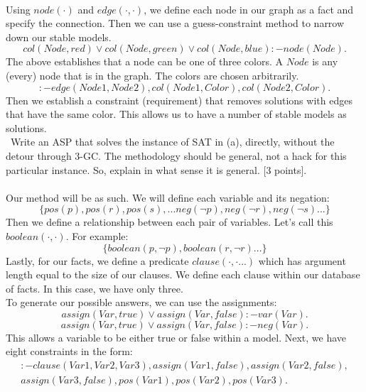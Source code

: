 \documentclass[12pt,fullpage]{article}
\begin{document}
\vspace{2mm} \\
Using $node(\cdot)$ and $edge(\cdot, \cdot)$, we define each node in our graph as a fact and specify the connection. Then we can use a guess-constraint method to narrow down our stable models.
$$col(Node, red) \vee col(Node, green) \vee col(Node, blue) :- node(Node).$$
The above establishes that a node can be one of three colors. A $Node$ is any (every) node that is in the graph. The colors are chosen arbitrarily.
$$:- edge(Node1, Node2),col(Node1, Color), col(Node2, Color).$$
Then we establish a constraint (requirement) that removes solutions with edges that have the same color. This allows us to have a number of stable models as solutions.\\


 \ Write an ASP that solves the instance of SAT in (a), directly,  without the detour through 3-GC. The methodology should be general, not a hack for this particular instance. So, explain in what sense it is general. \hfill
[3 points]. \\

\vspace{2mm} \\
Our method will be as such. We will define each variable and its negation:
$$\{pos(p), pos(r), pos(s), ... neg(\neg p), neg(\neg r), neg(\neg s)...\}$$
Then we define a relationship between each pair of variables. Let's call this $boolean(\cdot, \cdot)$. For example:
$$\{boolean(p, \neg p), boolean(r, \neg r)...\}$$
Lastly, for our facts, we define a predicate $clause(\cdot, \cdot ...)$ which has argument length equal to the size of our clauses. We define each clause within our database of facts. In this case, we have only three.\\
To generate our possible answers, we can use the assignments:
$$assign(Var, true) \vee assign(Var, false):- var(Var).$$
$$assign(Var, true) \vee assign(Var, false):- neg(Var).$$
This allows a variable to be either true or false within a model. Next, we have eight constraints in the form:
\begin{equation*}
  \begin{aligned}
:- clause(Var1, Var2, Var3), assign(Var1, false), assign(Var2, false),\\ assign(Var3, false), pos(Var1), pos(Var2), pos(Var3).
\end{aligned}
\end{equation*}
\end{document}
